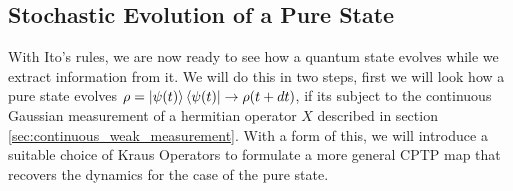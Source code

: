 


\subsection{Stochastic Evolution of a Pure State}
With Ito's rules, we are now ready to see how a quantum state evolves while we extract information from it. We will do this in two steps, first we will look how a pure state evolves $\rho = \ket{\psi(t)}\bra{\psi(t)} \to \rho(t+dt)$, if its subject to the continuous Gaussian measurement of a hermitian operator $X$ described in section \ref{sec:continuous_weak_measurement}. With a form of this, we will introduce a suitable choice of Kraus Operators to formulate a more general CPTP map that recovers the dynamics for the case of the pure state.

